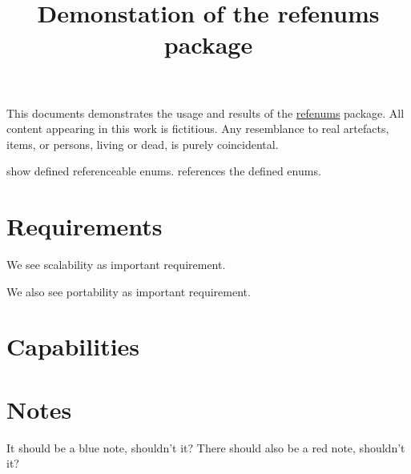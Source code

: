 \documentclass[parskip=full]{scrartcl}
\begin{document}
\title{Demonstation of the refenums package}
\date{}
\maketitle

\vspace{-12ex}
This documents demonstrates the usage and results of the \href{http://mirror.ctan.org/tex-archive/macros/latex/contrib/refenums/}{refenums} package.
All content appearing in this work is fictitious.
Any resemblance to real artefacts, items, or persons, living or dead, is purely coincidental.

 show defined referenceable enums.
 references the defined enums.

\tableofcontents
\clearpage








\section{Requirements}
\label{sec:reqs}
We see scalability as important requirement.

We also see portability as important requirement.


\section{Capabilities}

\section{Notes}
 It should be a blue note, shouldn't it?
 There should also be a red note, shouldn't it?
\end{document}
